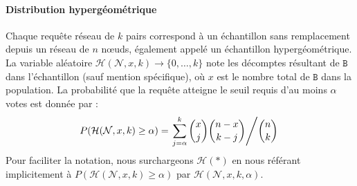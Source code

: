 \documentclass[letterpaper,twocolumn,10pt]{article}
\theoremstyle{definition}
\begin{document}
\begin{appendices}
\paragraph{Distribution hypergéométrique} Chaque requête réseau de $k$ pairs correspond à un échantillon sans remplacement depuis un réseau de $n$ nœuds, également appelé un échantillon hypergéométrique.
La variable aléatoire $\mathcal{H}(\mathcal{N}, x, k) \rightarrow \{0, \dots, k\}$ note les décomptes résultant de $\mathtt{B}$ dans l'échantillon (sauf mention spécifique), où $x$ est le nombre total de $\mathtt{B}$ dans la population. La probabilité que la requête atteigne le seuil requis d'au moins $\alpha$ votes est donnée par :
\begin{equation}
\small
P(\mathcal{H}(\mathcal{N}, x, k) \geq \alpha) = \left.\sum_{j = \alpha}^{k} {x \choose j} {n - x \choose k - j} \middle/ {n \choose k}\right.
\label{eq:hypergeometric}
\end{equation}
Pour faciliter la notation, nous surchargeons $\mathcal{H}(*)$ en nous référant implicitement à $P(\mathcal{H}(\mathcal{N}, x, k) \geq \alpha)$ par $\mathcal{H}(\mathcal{N}, x, k, \alpha)$.


\end{appendices}
\end{document}
